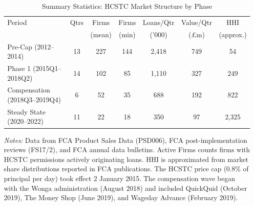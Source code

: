 \begin{table}[t]
\centering
\caption{Summary Statistics: HCSTC Market Structure by Phase}
\label{tab:summary}
\begin{threeparttable}\small
\begin{tabular}{@{}lcccccc@{}}
\toprule
Period & Qtrs & Firms & Firms & Loans/Qtr & Value/Qtr & HHI \\
 & & (mean) & (min) & ('000) & (\pounds m) & (approx.) \\
\midrule
Pre-Cap (2012--2014) & 13 & 227 & 144 & 2,418 & 749 & 54 \\
Phase 1 (2015Q1--2018Q2) & 14 & 102 & 85 & 1,110 & 327 & 249 \\
Compensation (2018Q3--2019Q4) & 6 & 52 & 35 & 688 & 192 & 822 \\
Steady State (2020--2022) & 11 & 22 & 18 & 350 & 97 & 2,325 \\
\bottomrule
\end{tabular}
\begin{tablenotes}
\item \textit{Notes:} Data from FCA Product Sales Data (PSD006), FCA post-implementation reviews (FS17/2), and FCA annual data bulletins. Active Firms counts firms with HCSTC permissions actively originating loans. HHI is approximated from market share distributions reported in FCA publications. The HCSTC price cap (0.8\% of principal per day) took effect 2 January 2015. The compensation wave began with the Wonga administration (August 2018) and included QuickQuid (October 2019), The Money Shop (June 2019), and Wageday Advance (February 2019).
\end{tablenotes}
\end{threeparttable}
\end{table}
